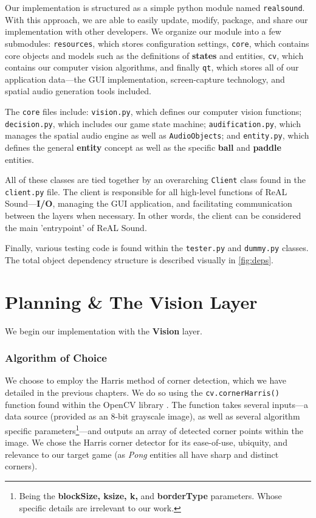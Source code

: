 \documentclass{report}
\newcommand{\rs}{ReAL Sound\xspace}
\newcommand{\state}[1]{\textbf{#1}}
\newcommand{\vision}{\textbf{Vision}\xspace}
\newcommand{\pad}{\textbf{paddle}\xspace}
\newcommand{\ball}{\textbf{ball}\xspace}
\newcommand{\tech}[1]{\textbf{#1}}
\begin{document}
Our implementation is structured as a simple python module named \texttt{realsound}. With this approach, we are able to easily update, modify, package, and share our implementation with other developers. We organize our module into a few submodules: \texttt{resources}, which stores configuration settings, \texttt{core}, which contains core objects and models such as the definitions of \state{states} and entities, \texttt{cv}, which contains our computer vision algorithms, and finally \texttt{qt}, which stores all of our application data---the GUI implementation, screen-capture technology, and spatial audio generation tools included. 

The \texttt{core} files include: \texttt{vision.py}, which defines our computer vision functions; \texttt{decision.py}, which includes our game state machine; \texttt{audification.py}, which manages the spatial audio engine as well as \texttt{AudioObjects}; and \texttt{entity.py}, which defines the general \state{entity} concept as well as the specific \ball and \pad entities. 

All of these classes are tied together by an overarching \texttt{Client} class found in the \texttt{client.py} file. The client is responsible for all high-level functions of \rs---\textbf{I/O}, managing the GUI application, and facilitating communication between the layers when necessary. In other words, the client can be considered the main 'entrypoint' of \rs. 

Finally, various testing code is found within the \texttt{tester.py} and \texttt{dummy.py} classes. The total object dependency structure is described visually in \cref{fig:deps}.  

\subsubsection{}

\section{Planning \& The Vision Layer}
We begin our implementation with the \vision layer. 

\subsubsection{Algorithm of Choice}

We choose to employ the Harris method of corner detection, which we have detailed in the previous chapters. We do so using the \texttt{cv.cornerHarris()} function found within the OpenCV library \cite{OpenCV}. The function takes several inputs---a data source (provided as an 8-bit grayscale image), as well as several algorithm specific parameters\footnote{Being the \tech{blockSize, ksize, k, } and \tech{borderType} parameters. Whose specific details are irrelevant to our work.}---and outputs an array of detected corner points within the image. We chose the Harris corner detector for its ease-of-use, ubiquity, and relevance to our target game (as \emph{Pong} entities all have sharp and distinct corners).
\end{document}
